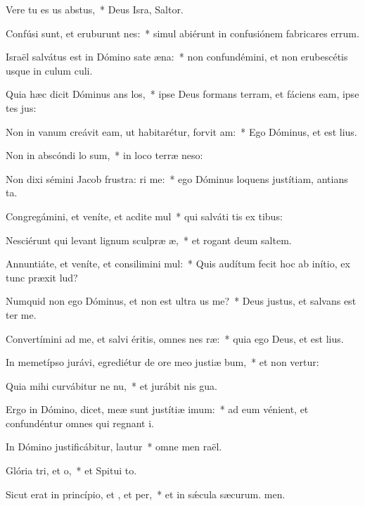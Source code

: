 \item Vere tu es us abstus,~* Deus Isra, Saltor.
\item Confúsi sunt, et eruburunt nes:~* simul abiérunt in confusiónem fabricares errum.
\item Israël salvátus est in Dómino sate æna:~* non confundémini, et non erubescétis usque in culum culi.
\item Quia hæc dicit Dóminus ans los,~* ipse Deus formans terram, et fáciens eam, ipse tes jus:
\item Non in vanum creávit eam, ut habitarétur, forvit am:~* Ego Dóminus, et  est lius.
\item Non in abscóndi lo sum,~* in loco terræ neso:
\item Non dixi sémini Jacob frustra: ri me:~* ego Dóminus loquens justítiam, antians ta.
\item Congregámini, et veníte, et acdite mul~* qui salváti tis ex tibus:
\item Nesciérunt qui levant lignum sculpræ æ,~* et rogant deum  saltem.
\item Annuntiáte, et veníte, et consilimini mul:~* Quis audítum fecit hoc ab inítio, ex tunc præxit lud?
\item Numquid non ego Dóminus, et non est ultra us  me?~* Deus justus, et salvans  est ter me.
\item Convertímini ad me, et salvi éritis, omnes nes ræ:~* quia ego Deus, et  est lius.
\item In memetípso jurávi, egrediétur de ore meo justiæ bum,~* et non vertur:
\item Quia mihi curvábitur ne nu,~* et jurábit nis gua.
\item Ergo in Dómino, dicet, meæ sunt justítiæ  imum:~* ad eum vénient, et confundéntur omnes qui regnant i.
\item In Dómino justificábitur,  lautur~* omne men raël.
\item Glória tri, et o,~* et Spitui to.
\item Sicut erat in princípio, et , et per,~* et in sǽcula sæcurum. men.
